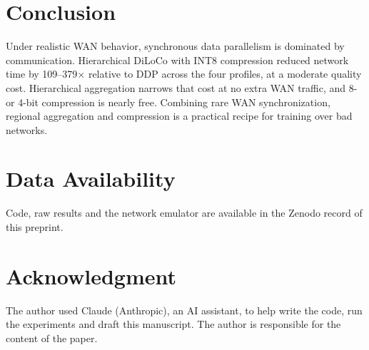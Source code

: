 \documentclass[conference]{IEEEtran}
\begin{document}
\section{Conclusion}
Under realistic WAN behavior, synchronous data parallelism is dominated by communication. Hierarchical DiLoCo with INT8 compression reduced network time by 109--379$\times$ relative to DDP across the four profiles, at a moderate quality cost. Hierarchical aggregation narrows that cost at no extra WAN traffic, and 8- or 4-bit compression is nearly free. Combining rare WAN synchronization, regional aggregation and compression is a practical recipe for training over bad networks.

\section*{Data Availability}
Code, raw results and the network emulator are available in the Zenodo record of this preprint.

\section*{Acknowledgment}
The author used Claude (Anthropic), an AI assistant, to help write the code, run the experiments and draft this manuscript. The author is responsible for the content of the paper.



\end{document}
